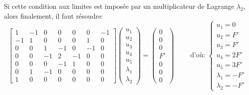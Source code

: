 Si cette condition aux limites est imposée par un multiplicateur de Lagrange $\lambda_2$, alors finalement, il faut résoudre:
\begin{equation}
\begin{bmatrix} 1&-1&0&0&0&0&-1 \\ -1&1&0&0&0&1&0 \\ 0&0&1&-1&0&-1&0\\ 
0&0&-1&2&-1&0&0\\ 0&0&0&-1&1&0&0 \\ 0&1&-1&0&0&0&0 \\ 1&0&0&0&0&0&0
\end{bmatrix}
\begin{pmatrix} u_1\\u_2\\u_3\\u_4\\ u_5\\ \lambda_1 \\ \lambda_2 \end{pmatrix}
=
\begin{pmatrix} 0\\0\\0\\F' \\ 0 \\ 0 \\ 0\end{pmatrix}
\qquad \text{ d'où: } 
\left\{\begin{array}{l} u_1=0 \\ u_2=F' \\ u_3=F' \\ u_4=2F' \\ u_5=3F' \\ \lambda_1 = -F' \\ \lambda_2 = -F' \end{array}\right.
\end{equation}